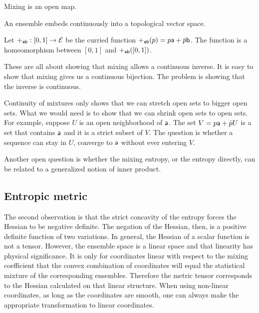 \begin{conj}
	Mixing is an open map.
\end{conj}

\begin{conj}
	An ensemble embeds continuously into a topological vector space.
\end{conj}

\begin{conj}
	Let $+_{\ens[a]\ens[b]} : [0,1] \to \Ens$ be the curried function $+_{\ens[a]\ens[b]}(p) = p\ens[a] + \bar{p}\ens[b]$. The function is a homeomorphism between $[0,1]$ and $+_{\ens[a]\ens[b]}([0,1])$.
\end{conj}

\begin{remark}
	These are all about showing that mixing allows a continuous inverse. It is easy to show that mixing gives us a continuous bijection. The problem is showing that the inverse is continuous.
	
	Continuity of mixtures only shows that we can stretch open sets to bigger open sets. What we would need is to show that we can shrink open sets to open sets. For example, suppose $U$ is an open neighborhood of $\ens[a]$. The set $V = p \ens[a] + \bar{p} U$ is a set that contains $\ens[a]$ and it is a strict subset of $V$. The question is whether a sequence can stay in $U$, converge to $\ens[a]$ without ever entering $V$.
\end{remark}

Another open question is whether the mixing entropy, or the entropy directly, can be related to a generalized notion of inner product.

\subsection{Entropic metric}

The second observation is that the strict concavity of the entropy forces the Hessian to be negative definite. The negation of the Hessian, then, is a positive definite function of two variations. In general, the Hessian of a scalar function is not a tensor. However, the ensemble space is a linear space and that linearity has physical significance. It is only for coordinates linear with respect to the mixing coefficient that the convex combination of coordinates will equal the statistical mixture of the corresponding ensembles. Therefore the metric tensor corresponds to the Hessian calculated on that linear structure. When using non-linear coordinates, as long as the coordinates are smooth, one can always make the appropriate transformation to linear coordinates.


